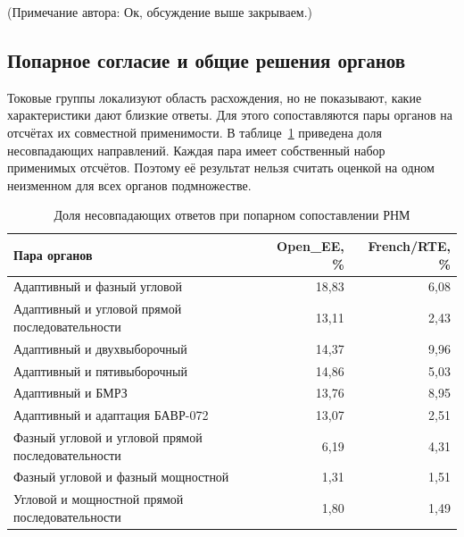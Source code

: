 (Примечание автора: Ок, обсуждение выше закрываем.)
\fi

{}

\subsection{Попарное согласие и общие решения органов}
\label{sec:ch5_population_agreement}

Токовые группы локализуют область расхождения,
но не показывают, какие характеристики дают близкие ответы.
Для этого сопоставляются пары органов
на отсчётах их совместной применимости.
В таблице~\ref{tab:ch5_pairwise_disagreement}
приведена доля несовпадающих направлений.
Каждая пара имеет собственный набор применимых отсчётов.
Поэтому её результат нельзя считать оценкой
на одном неизменном для всех органов подмножестве.

{}

\begin{table}[htbp]
\centering\small
\caption{Доля несовпадающих ответов при попарном сопоставлении РНМ}
\label{tab:ch5_pairwise_disagreement}
\begin{tabular}{p{}rr}
\toprule
Пара органов & Open\_EE, \% & French/RTE, \% \\
\midrule
Адаптивный и фазный угловой & 18,83 & 6,08 \\
Адаптивный и угловой прямой последовательности & 13,11 & 2,43 \\
Адаптивный и двухвыборочный & 14,37 & 9,96 \\
Адаптивный и пятивыборочный & 14,86 & 5,03 \\
Адаптивный и БМРЗ & 13,76 & 8,95 \\
Адаптивный и адаптация БАВР-072 & 13,07 & 2,51 \\
Фазный угловой и угловой прямой последовательности & 6,19 & 4,31 \\
Фазный угловой и фазный мощностной & 1,31 & 1,51 \\
Угловой и мощностной прямой последовательности & 1,80 & 1,49 \\
\bottomrule
\end{tabular}
\end{table}


